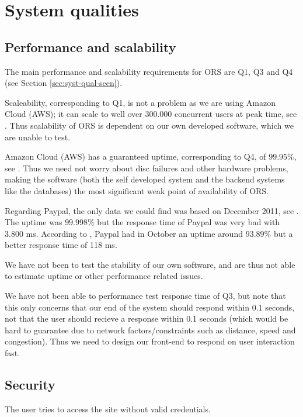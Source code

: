 \chapter{System qualities}
\label{cha:system-qualities}
\thispagestyle{fancy}


\section{Performance and scalability}
\label{sec:perf-scal}
The main performance and scalability requirements for ORS are Q1, Q3 and Q4 (see Section \ref{sec:syst-qual-scen}).

Scaleability, corresponding to Q1, is not a problem as we are using Amazon Cloud (AWS); it can scale to well over 300.000 concurrent users at peak time, see \cite{amazonCaseStudy}. Thus scalability of ORS is dependent on our own developed software, which we are unable to test.

Amazon Cloud (AWS) has a guaranteed uptime, corresponding to Q4, of $99.95\%$, see \cite{amazonSla}. Thus we need not worry about disc failures and other hardware problems, making the software (both the self developed system and the backend systems like the databases) the most significant weak point of availability of ORS.

Regarding Paypal, the only data we could find was based on December 2011, see \cite{pingdom}. The uptime was $99.998\%$ but the response time of Paypal was very bad with 3.800 ms. According to \cite{basicState}, Paypal had in October an uptime around $93.89\%$ but a better response time of 118 ms.

We have not been to test the stability of our own software, and are thus not able to estimate uptime or other performance related issues.

We have not been able to performance test response time of Q3, but note that this only concerns that our end of the system should respond within 0.1 seconds, not that the user should recieve a response within 0.1 seconds (which would be hard to guarantee due to network factors/constraints such as distance, speed and congestion). Thus we need to design our front-end to respond on user interaction fast.


\section{Security}
\label{sec:security}

The user tries to access the site without valid credentials.

